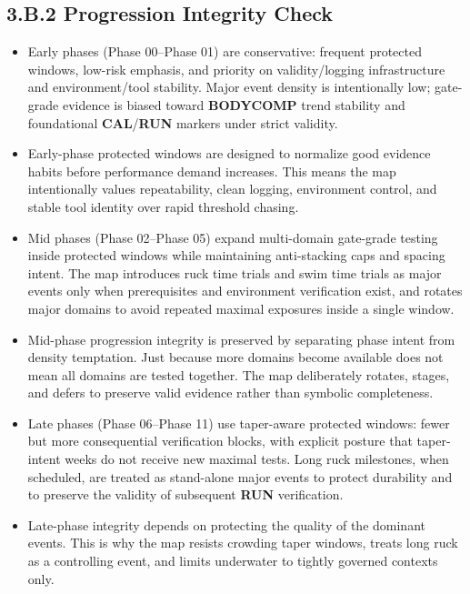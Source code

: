 \documentclass[10pt]{article}
\begin{document}
\newpage

\subsection*{3.B.2 Progression Integrity Check}
{}

\begin{itemize}
\item Early phases (Phase 00–Phase 01) are conservative: frequent protected windows, low-risk emphasis, and priority on validity/logging infrastructure and environment/tool stability. Major event density is intentionally low; gate-grade evidence is biased toward \textbf{BODYCOMP} trend stability and foundational \textbf{CAL}/\textbf{RUN} markers under strict validity.

\item Early-phase protected windows are designed to normalize good evidence habits before performance demand increases. This means the map intentionally values repeatability, clean logging, environment control, and stable tool identity over rapid threshold chasing.

\item Mid phases (Phase 02–Phase 05) expand multi-domain gate-grade testing inside protected windows while maintaining anti-stacking caps and spacing intent. The map introduces ruck time trials and swim time trials as major events only when prerequisites and environment verification exist, and rotates major domains to avoid repeated maximal exposures inside a single window.

\item Mid-phase progression integrity is preserved by separating phase intent from density temptation. Just because more domains become available does not mean all domains are tested together. The map deliberately rotates, stages, and defers to preserve valid evidence rather than symbolic completeness.

\item Late phases (Phase 06–Phase 11) use taper-aware protected windows: fewer but more consequential verification blocks, with explicit posture that taper-intent weeks do not receive new maximal tests. Long ruck milestones, when scheduled, are treated as stand-alone major events to protect durability and to preserve the validity of subsequent \textbf{RUN} verification.

\item Late-phase integrity depends on protecting the quality of the dominant events. This is why the map resists crowding taper windows, treats long ruck as a controlling event, and limits underwater to tightly governed contexts only.


\end{itemize}
\end{document}
